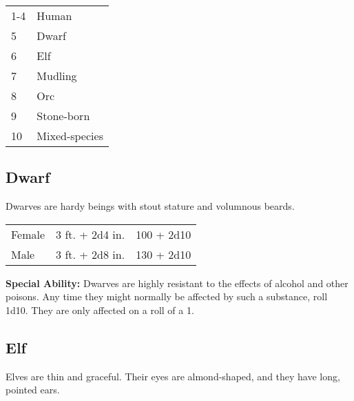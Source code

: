 \begin{multicols}{2}
\begin{center}
{
\begin{xtabular}{|l|l|}
1-4 & Human \\
5 & Dwarf \\
6 & Elf \\
7 & Mudling \\
8 & Orc \\
9 & Stone-born \\
10 & Mixed-species \\
\hline
\end{xtabular}
}
\end{center}

\subsection{Dwarf}

Dwarves are hardy beings with stout stature and volumnous beards.

\begin{center}
{
\begin{xtabular}{|l|l|l|}
Female & 3 ft. + 2d4 in. & 100 + 2d10 \\
Male & 3 ft. + 2d8 in. & 130 + 2d10 \\
\hline
\end{xtabular}
}
\end{center}

\textbf{Special Ability:} Dwarves are highly resistant to the effects of alcohol and other poisons. Any time they might normally be affected by such a substance, roll 1d10. They are only affected on a roll of a 1.

\subsection{Elf}

Elves are thin and graceful. Their eyes are almond-shaped, and they
have long, pointed ears.


\end{multicols}
